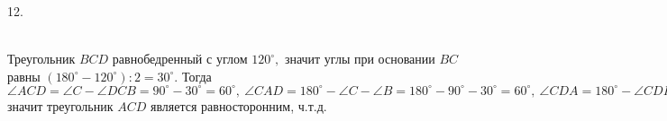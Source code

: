 12. \begin{figure}[ht!]
\end{figure}\\
Треугольник $BCD$ равнобедренный с углом $120^\circ,$ значит углы при основании $BC$ равны $(180^\circ-120^\circ):2=30^\circ.$ Тогда $\angle ACD=\angle C-\angle DCB=90^\circ-30^\circ=60^\circ,\ \angle CAD=180^\circ-\angle C-\angle B=180^\circ-90^\circ-30^\circ=60^\circ,\ \angle CDA=180^\circ-\angle CDB=180^\circ-120^\circ=60^\circ,$
значит треугольник $ACD$ является равносторонним, ч.т.д.\\
